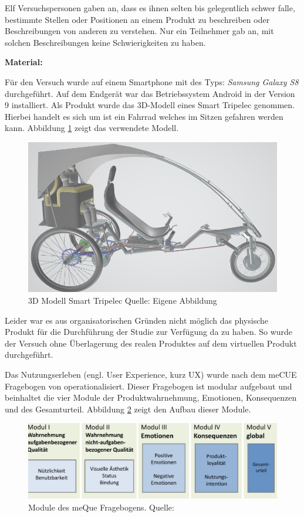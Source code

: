 Elf Versuchspersonen gaben an, dass es ihnen selten bis gelegentlich schwer falle, bestimmte Stellen oder Positionen an einem Produkt zu beschreiben oder Beschreibungen von anderen zu verstehen. Nur ein Teilnehmer gab an, mit 
solchen Beschreibungen keine Schwierigkeiten zu haben. 

\textbf{Material: }

Für den Versuch wurde auf einem Smartphone mit des Typs: \textit{Samsung Galaxy S8} durchgeführt. Auf dem Endgerät war das Betriebssystem Android in der Version 9 installiert. 
Als Produkt wurde das 3D-Modell eines Smart Tripelec genommen. Hierbei handelt es sich um ist ein Fahrrad welches im Sitzen gefahren werden kann. Abbildung \ref{img:trip} zeigt das verwendete Modell.

\begin{figure}[H]
	\centering 
	\includegraphics[width=.6\textwidth]{resources/evaluation/SmartTripelec.png}
	\caption{3D Modell Smart Tripelec Quelle: Eigene Abbildung}
	\label{img:trip}
\end{figure}

Leider war es aus organisatorischen Gründen nicht möglich das physische Produkt für die Durchführung der Studie zur Verfügung da zu haben. So wurde der Versuch ohne Überlagerung des realen Produktes auf dem virtuellen Produkt durchgeführt. 

Das Nutzungserleben (engl. User Experience, kurz UX) wurde nach dem meCUE Fragebogen von \citeauthor{Minge2013} operationalisiert. Dieser Fragebogen ist modular aufgebaut und beinhaltet die vier Module der 
Produktwahrnehmung, Emotionen, Konsequenzen und des Gesamturteil. Abbildung \ref{img:mequeMoudul} zeigt den Aufbau dieser Module.

\begin{figure}[H]
	\centering 
	\includegraphics[width=.6\textwidth]{resources/evaluation/meQueModul.png}
	\caption{Module des meQue Fragebogens. Quelle: \cite[S.~4]{Minge2013}}
	\label{img:mequeMoudul}
\end{figure} 

